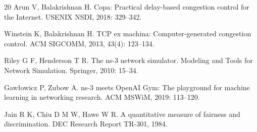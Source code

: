 \documentclass[10pt,twocolumn]{article}
\begin{document}
{\begin{thebibliography}{20}
Arun V, Balakrishnan H. Copa: Practical delay-based congestion control for the Internet. USENIX NSDI, 2018: 329--342.

Winstein K, Balakrishnan H. TCP ex machina: Computer-generated congestion control. ACM SIGCOMM, 2013, 43(4): 123--134.

Riley G F, Henderson T R. The ns-3 network simulator. Modeling and Tools for Network Simulation. Springer, 2010: 15--34.

Gaw{\l}owicz P, Zubow A. ns-3 meets OpenAI Gym: The playground for machine learning in networking research. ACM MSWiM, 2019: 113--120.

Jain R K, Chiu D M W, Hawe W R. A quantitative measure of fairness and discrimination. DEC Research Report TR-301, 1984.

\end{thebibliography}
}
\end{document}
